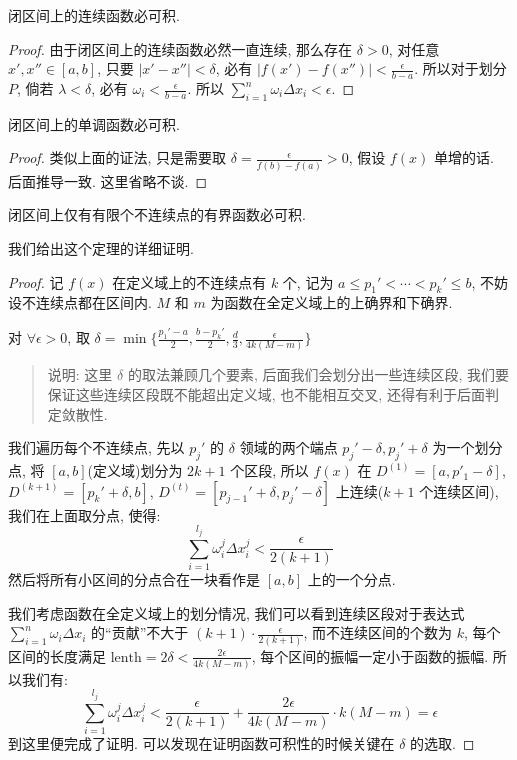 \documentclass[a4paper,12pt]{ctexart}
\begin{document}
\begin{mycor}{}{}
闭区间上的连续函数必可积.
\end{mycor}

\begin{proof}
由于闭区间上的连续函数必然一直连续, 那么存在 $\delta>0$, 对任意 $x', x'' \in [a,b]$, 只要 $|x'-x''|<\delta$, 必有 $|f(x')-f(x'')| < \frac{\epsilon}{b-a}$.  
所以对于划分 $P$, 倘若 $\lambda < \delta$, 必有 $\omega_i < \frac{\epsilon}{b-a}$.  
所以 $\sum_{i=1}^{n} \omega_i\Delta x_i < \epsilon$.
\end{proof}

\begin{mycor}{}{}
闭区间上的单调函数必可积.
\end{mycor}

\begin{proof}
类似上面的证法, 只是需要取 $\delta = \frac{\epsilon}{f(b)-f(a)} >0$, 假设 $f(x)$ 单增的话. 后面推导一致. 这里省略不谈.
\end{proof}

\begin{mycor}{}{}
闭区间上仅有有限个不连续点的有界函数必可积.
\end{mycor}

我们给出这个定理的详细证明.

\begin{proof}
记 $f(x)$ 在定义域上的不连续点有 $k$ 个, 记为 $a \le p_1' < \cdots < p_k' \le b$, 不妨设不连续点都在区间内. $M$ 和 $m$ 为函数在全定义域上的上确界和下确界.

对 $\forall \epsilon >0$, 取 $\delta = \min \{\frac{p_1'-a}{2},\frac{b-p_k'}{2},\frac{d}{3},\frac{\epsilon}{4k(M-m)}\}$

\begin{quote}
说明: 这里 $\delta$ 的取法兼顾几个要素, 后面我们会划分出一些连续区段, 我们要保证这些连续区段既不能超出定义域, 也不能相互交叉, 还得有利于后面判定敛散性.
\end{quote}

我们遍历每个不连续点, 先以 $p_j'$ 的 $\delta$ 领域的两个端点 $p_j'-\delta,p_j'+\delta$ 为一个划分点, 将 $[a,b]$(定义域)划分为 $2k+1$ 个区段, 所以 $f(x)$ 在 $D^{(1)} = [a, p'_1-\delta]$, $D^{(k+1)} = [p_k'+\delta,b]$, $D^{(t)} = [p_{j-1}'+\delta , p_j'-\delta]$ 上连续($k+1$ 个连续区间), 我们在上面取分点, 使得:
$$
\sum_{i=1}^{l_j} \omega_i^{j} \Delta x_i^{j} < \frac{\epsilon}{2(k+1)}
$$
然后将所有小区间的分点合在一块看作是 $[a,b]$ 上的一个分点.

我们考虑函数在全定义域上的划分情况, 我们可以看到连续区段对于表达式 $\sum_{i=1}^n \omega_i \Delta x_i$ 的“贡献”不大于 $(k+1) \cdot \frac{\epsilon}{2(k+1)}$, 而不连续区间的个数为 $k$, 每个区间的长度满足 $\text{lenth} = 2\delta < \frac{2\epsilon}{4k(M-m)}$, 每个区间的振幅一定小于函数的振幅. 所以我们有:
$$
\sum_{i=1}^{l_j} \omega_i^{j} \Delta x_i^{j} < \frac{\epsilon}{2(k+1)} + \frac{2\epsilon}{4k(M-m)} \cdot k(M-m) = \epsilon
$$
到这里便完成了证明. 可以发现在证明函数可积性的时候关键在 $\delta$ 的选取.
\end{proof}
\end{document}
